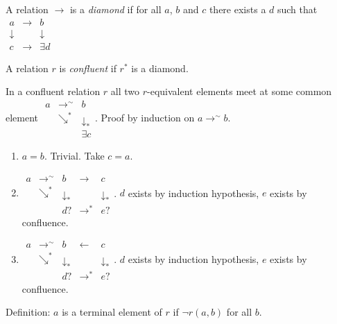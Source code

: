 \documentclass{article}
\newcommand{\rstar}[1]{#1^*}
\newcommand{\reqv}[1]{#1^\sim}
\begin{document}
\begin{definition}
A relation $\to$ is a \emph{diamond} if for all $a$, $b$ and $c$ there exists a $d$
such that
$
  \begin{matrix}
    a & \to & b \\
    \downarrow & & \downarrow \\
    c & \to & \exists d
  \end{matrix}
$
\end{definition}


\begin{definition}
  A relation $r$ is \emph{confluent} if $\rstar{r}$ is a diamond.
\end{definition}

\begin{theorem} In a confluent relation $r$ all two $r$-equivalent elements
  meet at some common element
  $
  \begin{matrix}
    a & \reqv\to & b \\
    & \rstar\searrow & \downarrow_*\\
    & & \exists c
  \end{matrix}
  $.
  Proof by induction on $a\reqv\to b$.
  \begin{enumerate}

  \item $a = b$. Trivial. Take $c = a$.

  \item
    $\begin{matrix}
      a & \reqv\to & b & \to & c\\
      & \rstar\searrow & \downarrow_*  & & \downarrow_*\\
      & & d? & \rstar\to & e?
    \end{matrix}$.
    $d$ exists by induction hypothesis, $e$ exists by confluence.

  \item
    $
    \begin{matrix}
      a & \reqv\to & b & \gets & c\\
      & \rstar\searrow & \downarrow_*  & & \downarrow_*\\
      & & d? & \rstar\to & e?
    \end{matrix}
    $.
    $d$ exists by induction hypothesis, $e$ exists by confluence.
  \end{enumerate}
\end{theorem}

Definition: $a$ is a terminal element of $r$ if $\neg r(a,b)$ for all $b$.
\end{document}
